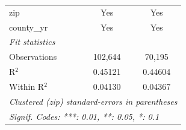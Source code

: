 \begin{tabular}{lcc}
   zip                                                    & Yes             & Yes\\  
   county\_yr                                             & Yes             & Yes\\  
   \midrule
   \emph{Fit statistics}\\
   Observations                                           & 102,644         & 70,195\\  
   R$^2$                                                  & 0.45121         & 0.44604\\  
   Within R$^2$                                           & 0.04130         & 0.04367\\  
   \midrule \midrule
   \multicolumn{3}{l}{\emph{Clustered (zip) standard-errors in parentheses}}\\
   \multicolumn{3}{l}{\emph{Signif. Codes: ***: 0.01, **: 0.05, *: 0.1}}\\
\end{tabular}
\par\endgroup
